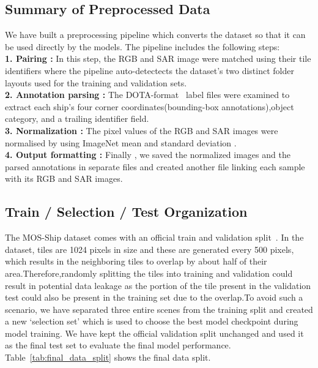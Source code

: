 \subsection{Summary of Preprocessed Data }We have built a preprocessing pipeline which converts the dataset so that it can be used directly by the models. The pipeline includes the following steps:
\\

\textbf{1. Pairing :} In this step, the  RGB and SAR image were matched using their tile identifiers where the pipeline auto-detectects the dataset's two distinct folder layouts used for the  training and validation sets.\\

\textbf{2. Annotation parsing :} The DOTA-format~\cite{xia2018dota} label files  were examined to extract each ship's four corner coordinates(bounding-box annotations),object category, and a trailing identifier field.
\\

\textbf{3. Normalization :} The pixel values of the RGB and SAR images were normalised by using ImageNet mean and standard deviation .\\

\textbf{4. Output formatting :} Finally , we saved the normalized images and the parsed annotations in separate files and created another file linking each sample with its RGB and SAR images.
\\

\subsection{Train / Selection / Test Organization}

The MOS-Ship dataset comes with an official train and validation split~\cite{you2026multi}. In the dataset, tiles are 1024 pixels in size and these are generated every 500 pixels, which results in the neighboring tiles to overlap by about half of their area.Therefore,randomly splitting the tiles into training and validation could result in potential data leakage as the portion of the tile present in the validation test could also be present in the training set due to the overlap.To avoid such a scenario, we have separated three entire scenes from the training split and created a new ‘selection set’ which is used to choose the best model checkpoint during model training. We have kept the official validation split unchanged and used it as the final test set to evaluate the final model performance. Table~\ref{tab:final_data_split} shows the final data split.
\\

